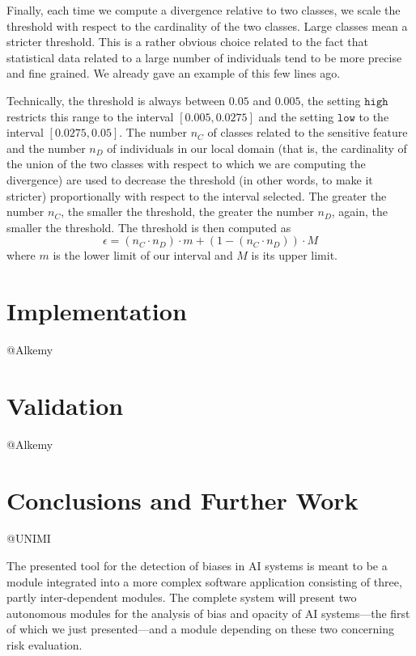 \documentclass[
]{ceurart}
\begin{document}
Finally, each time we compute a divergence relative to two classes, we scale the threshold with respect to the cardinality of the two classes. Large classes mean a stricter threshold. This is a rather obvious choice related to the fact that statistical data related to a large number of individuals tend to be more precise and fine grained. We already gave an example of this few lines ago.

Technically, the threshold is always between $0.05$ and $0.005$, the setting $\mathtt{high}$ restricts this range to the interval $[0.005,0.0275]$ and the setting $\mathtt{low}$ to the interval $[0.0275,0.05]$. The number $n_C$ of classes related to the sensitive feature and the number $n_D$ of individuals in our local domain (that is, the cardinality of the union of the two classes with respect to which we are computing the divergence) are used to decrease the threshold (in other words, to make it stricter) proportionally with respect to the interval selected. The greater the number $n_C$, the smaller the threshold, the greater the number $n_D$, again, the smaller the threshold. The threshold is then computed as
\[
\epsilon = (n_C \cdot n_D) \cdot m + (1-(n_C \cdot n_D)) \cdot M
\]
where $m$ is the lower limit of our interval and $M$ is its upper limit.

\section{Implementation}
\label{sec:implementation}

@Alkemy

\section{Validation}
\label{sec:validation}

@Alkemy


\section{Conclusions and Further Work}
\label{sec:conclusions}
@UNIMI

The presented tool for the detection of biases in AI systems is meant to be a module integrated into a more complex software application consisting of three, partly inter-dependent modules. The complete system will present two autonomous modules for the analysis of bias and opacity of AI systems---the first of which we just presented---and a module depending on these two concerning risk evaluation.
\end{document}
